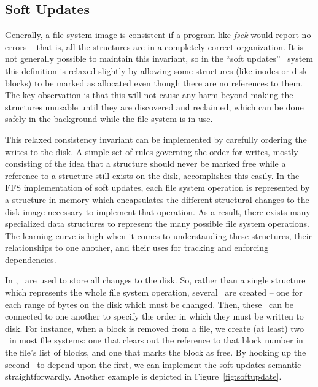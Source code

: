 \subsection {Soft Updates}
\label{sec:consistency:softupdate}


Generally, a file system image is consistent if a program like \emph{fsck}
would report no errors -- that is, all the structures are in a completely
correct organization. It is not generally possible to maintain this invariant,
so in the ``soft updates''~\cite{ganger00soft} system this definition is
relaxed slightly by allowing some structures (like inodes or disk blocks) to be
marked as allocated even though there are no references to them. The key
observation is that this will not cause any harm beyond making the structures
unusable until they are discovered and reclaimed, which can be done safely in
the background while the file system is in use.

This relaxed consistency invariant can be implemented by carefully ordering the
writes to the disk. A simple set of rules governing the order for writes,
mostly consisting of the idea that a structure should never be marked free
while a reference to a structure still exists on the disk, accomplishes this
easily. In the FFS implementation of soft updates, each file system operation
is represented by a structure in memory which encapsulates the different
structural changes to the disk image necessary to implement that operation.
As a result, there exists many specialized data structures to represent the
many possible file system operations. The learning curve is high when it comes
to understanding these structures, their relationships to one another, and
their uses for tracking and enforcing dependencies.

In \Kudos, \chdescs\ are used to store all changes to the disk. So, rather than
a single structure which represents the whole file system operation, several
\chdescs\ are created -- one for each range of bytes on the disk which must be
changed. Then, these \chdescs\ can be connected to one another to specify the
order in which they must be written to disk. For instance, when a block is
removed from a file, we create (at least) two \chdescs\ in most file systems:
one that clears out the reference to that block number in the file's list of
blocks, and one that marks the block as free. By hooking up the second \chdesc\
to depend upon the first, we can implement the soft updates semantic
straightforwardly. Another example is depicted in Figure~\ref{fig:softupdate}.

